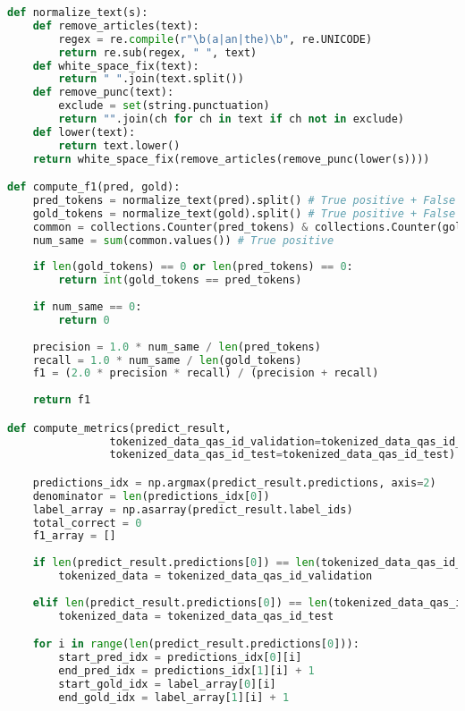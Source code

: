 \begin{lstlisting}[language=Python, caption=Perancangan metrik komputasi untuk penilaian \emph{question answering task}]
def normalize_text(s):
    def remove_articles(text):
        regex = re.compile(r"\b(a|an|the)\b", re.UNICODE)
        return re.sub(regex, " ", text)
    def white_space_fix(text):
        return " ".join(text.split())
    def remove_punc(text):
        exclude = set(string.punctuation)
        return "".join(ch for ch in text if ch not in exclude)
    def lower(text):
        return text.lower()
    return white_space_fix(remove_articles(remove_punc(lower(s))))

def compute_f1(pred, gold):
    pred_tokens = normalize_text(pred).split() # True positive + False positive = Untuk precision
    gold_tokens = normalize_text(gold).split() # True positive + False negatives = Untuk recall
    common = collections.Counter(pred_tokens) & collections.Counter(gold_tokens)
    num_same = sum(common.values()) # True positive
    
    if len(gold_tokens) == 0 or len(pred_tokens) == 0: 
        return int(gold_tokens == pred_tokens)
    
    if num_same == 0:
        return 0
    
    precision = 1.0 * num_same / len(pred_tokens)
    recall = 1.0 * num_same / len(gold_tokens)
    f1 = (2.0 * precision * recall) / (precision + recall)
    
    return f1

def compute_metrics(predict_result, 
                tokenized_data_qas_id_validation=tokenized_data_qas_id_validation, 
                tokenized_data_qas_id_test=tokenized_data_qas_id_test):

    predictions_idx = np.argmax(predict_result.predictions, axis=2)
    denominator = len(predictions_idx[0])
    label_array = np.asarray(predict_result.label_ids)
    total_correct = 0
    f1_array = []
    
    if len(predict_result.predictions[0]) == len(tokenized_data_qas_id_validation):
        tokenized_data = tokenized_data_qas_id_validation
    
    elif len(predict_result.predictions[0]) == len(tokenized_data_qas_id_test):
        tokenized_data = tokenized_data_qas_id_test

    for i in range(len(predict_result.predictions[0])):
        start_pred_idx = predictions_idx[0][i]
        end_pred_idx = predictions_idx[1][i] + 1
        start_gold_idx = label_array[0][i]
        end_gold_idx = label_array[1][i] + 1


\end{lstlisting}
